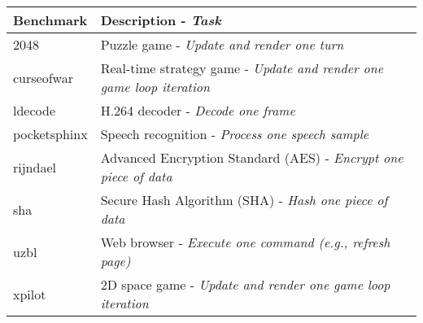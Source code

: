 \begin{tabular}{|l|l|}

\hline
{\bf Benchmark} & {\bf Description - \emph{Task}} \\ \hline\hline

2048 \cite{2048} & Puzzle game - \emph{Update and render one turn} \\ \hline
curseofwar \cite{curseofwar} & Real-time strategy game - \emph{Update and render one game loop iteration} \\ \hline
ldecode \cite{ldecode} & H.264 decoder - \emph{Decode one frame} \\ \hline
pocketsphinx \cite{pocketsphinx-icassp06} & Speech recognition - \emph{Process one speech sample} \\ \hline
rijndael \cite{mibench} & Advanced Encryption Standard (AES) - \emph{Encrypt one piece of data} \\ \hline
sha \cite{mibench} & Secure Hash Algorithm (SHA) - \emph{Hash one piece of data} \\ \hline
uzbl \cite{uzbl} & Web browser - \emph{Execute one command (e.g., refresh page)} \\ \hline
xpilot \cite{xpilot} & 2D space game - \emph{Update and render one game loop iteration} \\ \hline

\end{tabular}
